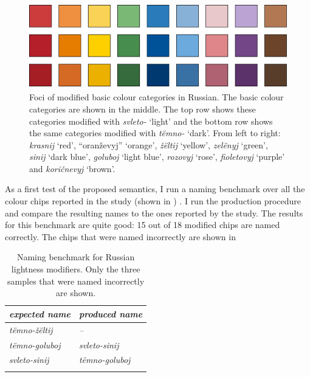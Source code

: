 \begin{figure}[htpb]
  \centering
  \includegraphics[height=3.75cm]{./achromatic/figures/russian-modified-foci.pdf}
  \caption[Foci of modified basic colour categories in Russian]{Foci
    of modified basic colour categories in Russian. The basic colour
    categories are shown in the middle. The top row shows these
    categories modified with \textit{svleto-} `light' and the bottom
    row shows the same categories modified with \textit{t\"emno-}
    `dark'.  From left to right: \textit{krasnij} `red', ``oran\v
    zevyj'' `orange', \textit{\v z\"eltij} `yellow',
    \textit{zel\"enyj} `green', \textit{sinij} `dark blue',
    \textit{goluboj} `light blue', \textit{rozovyj} `rose',
    \textit{fioletovyj} `purple' and \textit{kori\v cnevyj} `brown'.}
  \label{f:ams-russian-basic-modifiers}
\end{figure}

As a first test of the proposed semantics, I run a naming benchmark
over all the colour chips reported in the study (shown in )
. 
I run the production
procedure and compare the resulting names to the ones reported by the
study. The results for this benchmark are quite good: 15 out of 18
modified chips are named correctly. The chips that were named
incorrectly are shown in 

\begin{table}[htpb]
  \centering
  \begin{tabular}{>{\itshape}l>{\itshape}l}
  \lsptoprule
    \normalfont expected name & \normalfont produced name \\
    \midrule
    t\"emno-\v z\"eltij & \normalfont -- \\
    t\"emno-goluboj & svleto-sinij \\
    svleto-sinij & t\"emno-goluboj\\
    \lspbottomrule
  \end{tabular}
  \caption[Naming benchmark for Russian lightness modifiers]{Naming benchmark for Russian lightness modifiers. Only the three samples that were named incorrectly are shown.}
  \label{t:ams-russian-naming-benchmark}
\end{table}


